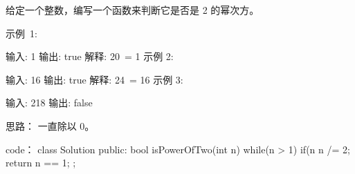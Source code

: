 给定一个整数，编写一个函数来判断它是否是 2 的幂次方。

示例 1:

输入: 1
输出: true
解释: 20 = 1
示例 2:

输入: 16
输出: true
解释: 24 = 16
示例 3:

输入: 218
输出: false





















思路：
一直除以 0。
























code：
class Solution {
public:
    bool isPowerOfTwo(int n) {
        while(n > 1)
        {
            if(n %
            n /= 2;
        }
        return n == 1;
    }
};